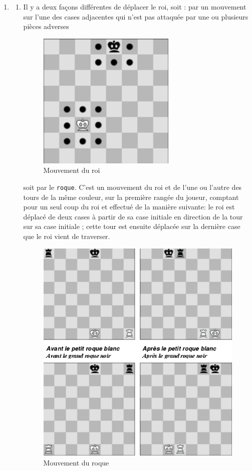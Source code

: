 \begin{enumerate}
\item
    \begin{enumerate}
    \item Il y a deux façons différentes de déplacer le roi, soit : par un mouvement sur l’une des cases adjacentes qui n’est pas attaquée par une ou plusieurs pièces adverses

    \begin{figure}[H]
        \centering
        \includegraphics[scale=0.5]{roi.png}
        \caption{Mouvement du roi}
    \end{figure}

    soit par le \texttt{roque}. C’est un mouvement du roi et de l’une ou l’autre des tours de la même couleur, sur la première rangée du joueur, comptant pour un seul coup du roi et effectué de la manière suivante: le roi est déplacé de deux cases à partir de sa case initiale en direction de la tour sur sa case initiale ; cette tour est ensuite déplacée sur la dernière case que le roi vient de traverser.
    \begin{figure}[H]
        \centering
        \includegraphics[scale=0.5]{roque.png}
        \caption{Mouvement du roque}
    \end{figure}


\end{enumerate}
\end{enumerate}
